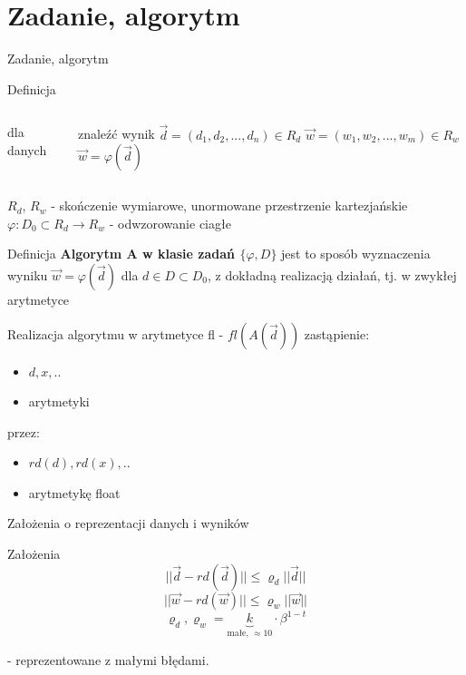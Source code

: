     \section{Zadanie, algorytm}
    \begin{frame}{Zadanie, algorytm}
    	\begin{block}{Definicja}
            \begin{columns}
                    \hfill dla danych
                    \newline

                    \hfill znaleźć wynik
                    $\vec{d} = \left( d_1, d_2, ..., d_n \right) \in R_d$\newline
                    $\vec{w} = \left( w_1, w_2, ..., w_m \right) \in R_w$\newline
                    $\vec{w} = \varphi(\vec{d})$
            \end{columns}
            $R_d$, $R_w$ - skończenie wymiarowe, unormowane przestrzenie kartezjańskie\newline
            $\varphi: D_0 \subset R_d \rightarrow R_w$ - odwzorowanie ciagłe
        \end{block}
        \begin{block}{Definicja}
        	{\bf Algorytm A w klasie zadań $\{\varphi, D\}$} jest to sposób wyznaczenia wyniku $\vec{w} = \varphi(\vec{d})$ dla $d \in D \subset D_0$, z dokładną realizacją działań, tj. w zwykłej arytmetyce
        \end{block}
    \end{frame}
    \begin{frame}{Realizacja algorytmu w arytmetyce fl - $fl(A(\vec{d}))$}
    	zastąpienie:
        \begin{itemize}
        	\item $d, x, ..$
            \item arytmetyki
        \end{itemize}
    	przez:
        \begin{itemize}
        	\item $rd(d), rd(x), ..$
            \item arytmetykę float
        \end{itemize}
    \end{frame}
    \begin{frame}{Założenia o reprezentacji danych i wyników}
    	\begin{block}{Założenia}
        \[
        || \vec{d} - rd(\vec{d}) ||
        \le 
        \varrho_d ||\vec{d} ||
        \] \[
        || \vec{w} - rd(\vec{w}) ||
        \le 
        \varrho_w ||\vec{w} ||
        \] \[
        \varrho_d, \varrho_w = \underbrace{k}_{\text{małe, } \approx 10} \cdot \beta^{1-t}
        \]
        \end{block}
        - reprezentowane z małymi błędami.
    \end{frame}
    
